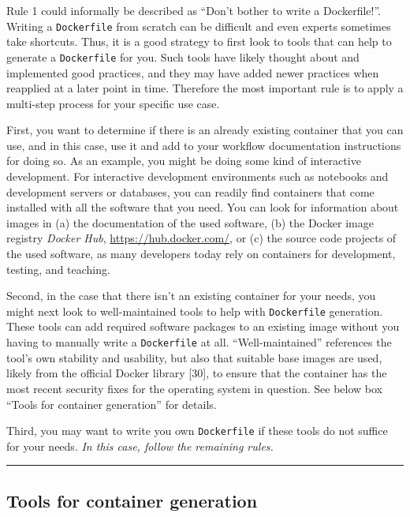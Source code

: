 \documentclass[10pt,letterpaper]{article}
\begin{document}
  \label{rule:tools} 

Rule 1 could informally be described as ``Don't bother to write a
Dockerfile!''. Writing a \texttt{Dockerfile} from scratch can be
difficult and even experts sometimes take shortcuts. Thus, it is a good
strategy to first look to tools that can help to generate a
\texttt{Dockerfile} for you. Such tools have likely thought about and
implemented good practices, and they may have added newer practices when
reapplied at a later point in time. Therefore the most important rule is
to apply a multi-step process for your specific use case.

First, you want to determine if there is an already existing container
that you can use, and in this case, use it and add to your workflow
documentation instructions for doing so. As an example, you might be
doing some kind of interactive development. For interactive development
environments such as notebooks and development servers or databases, you
can readily find containers that come installed with all the software
that you need. You can look for information about images in (a) the
documentation of the used software, (b) the Docker image registry
\emph{Docker Hub}, \url{https://hub.docker.com/}, or (c) the source code
projects of the used software, as many developers today rely on
containers for development, testing, and teaching.

Second, in the case that there isn't an existing container for your
needs, you might next look to well-maintained tools to help with
\texttt{Dockerfile} generation. These tools can add required software
packages to an existing image without you having to manually write a
\texttt{Dockerfile} at all. ``Well-maintained'' references the tool's
own stability and usability, but also that suitable base images are
used, likely from the official Docker library {[}30{]}, to ensure that
the container has the most recent security fixes for the operating
system in question. See below box ``Tools for container generation'' for
details.

Third, you may want to write you own \texttt{Dockerfile} if these tools
do not suffice for your needs. \emph{In this case, follow the remaining
rules.}

\begin{center}\rule{0.5\linewidth}{0.5pt}\end{center}

\hypertarget{tools-for-container-generation}{%
\subsection{Tools for container
generation}\label{tools-for-container-generation}}
\end{document}
